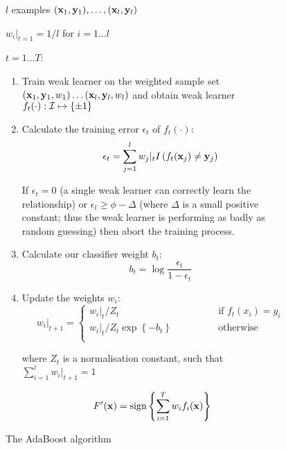 \begin{figure}
 $l$ examples $(\mathbf{x}_1, \mathbf{y}_1), \ldots, (\mathbf{x}_l,
\mathbf{y}_l)$
\par
{} $w_i|_{t=1} = 1/l$ for $i=1 \ldots l$
\par
{} $t=1 \ldots T$:


\begin{enumerate}

\item	Train weak learner on the weighted sample set 
	$(\mathbf{x}_1, \mathbf{y}_1, w_1) \ldots (\mathbf{x}_l, \mathbf{y}_l, w_l)$
	and obtain weak learner $f_t(\cdot) : \mathcal{I} \mapsto \{\pm 1\}$

\item	Calculate the training error $\epsilon_t$ of $f_t(\cdot)$:
	\begin{equation}
	\epsilon_t = \sum_{j=1}^l w_j |_t 
	I \left( f_t(\mathbf{x}_j) \neq \mathbf{y}_j\right)
	\end{equation}

	If $\epsilon_t = 0$ (a single weak learner can correctly learn
	the relationship) or $\epsilon_t \geq \phi - \Delta$ (where
	$\Delta$ is a small positive constant; thus the weak
	learner is performing as badly as random guessing) then abort
	the training process.

\item	Calculate our classifier weight $b_t$:
	\begin{equation}
	b_t = \log \frac{\epsilon_t}{1 - \epsilon_t}
	\end{equation}

\item	Update the weights $w_i$:
	\begin{equation}
	w_i|_{t+1} = \left\{
	\begin{array}{cl}
		w_i|_t / Z_t	&	\qquad \qquad \mbox{if
		$f_t(x_i) = y_i$} \\
		w_i|_t / Z_t \exp \left\{ -b_t \right\} & \qquad \qquad
		\mbox{otherwise} \\
	\end{array} \right.
	\end{equation}

	where $Z_t$ is a normalisation constant, such that
	$\sum_{i=1}^{l} w_i|_{t+1} = 1$
\end{enumerate}

\par
{} 
\begin{equation}
F'(\mathbf{x}) = \mathrm{sign} \left\{ \sum_{i=1}^T w_i f_i(\mathbf{x}) \right\}
\end{equation}
\caption{The AdaBoost algorithm}
\end{figure}

